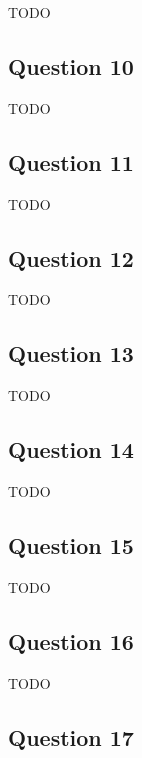 \documentclass[12pt, letterpaper, oneside]{book}
\begin{document}
TODO

\subsection{Question 10}

TODO

\subsection{Question 11}

TODO

\subsection{Question 12}

TODO

\subsection{Question 13}

TODO

\subsection{Question 14}

TODO

\subsection{Question 15}

TODO

\subsection{Question 16}

TODO

\subsection{Question 17}
\end{document}
